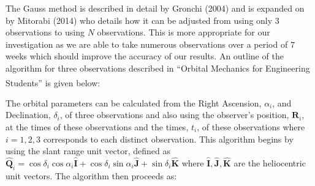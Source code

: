 \documentclass[10pt, twocolumn]{revtex4}    %
\newcommand{\scite}[1]{\textsuperscript{\cite{#1}}}
\begin{document}
The Gauss method is described in detail by Gronchi (2004) and is expanded on by Mitorabi (2014) who details how it can be adjusted from using only $3$ observations to using $N$ observations. This is more appropriate for our investigation as we are able to take numerous observations over a period of $7$ weeks which should improve the accuracy of our results. An outline of the algorithm for three observations described in ``Orbital Mechanics for Engineering Students''\scite{CurtisOrbitalmechanicsengineering2008} is given below:

\vspace{1ex}
The orbital parameters can be calculated from the Right Ascension, $\alpha_i$, and Declination, $\delta_i$, of three observations and also using the observer's position, $\mathbf{R}_i$, at the times of these observations and the times, $t_i$, of these observations where $i=1,2,3$ corresponds to each distinct observation. This algorithm begins by using the slant range unit vector, defined as $\mathbf{\hat{Q}}_i = \cos\delta_i \cos\alpha_i \mathbf{\hat{I}} + \cos\delta_i \sin\alpha_i \mathbf{\hat{J}} + \sin \delta_i \mathbf{\hat{K}}$ where $\mathbf{\hat{I},\hat{J},\hat{K}}$ are the heliocentric unit vectors. The algorithm then proceeds as:
\end{document}
